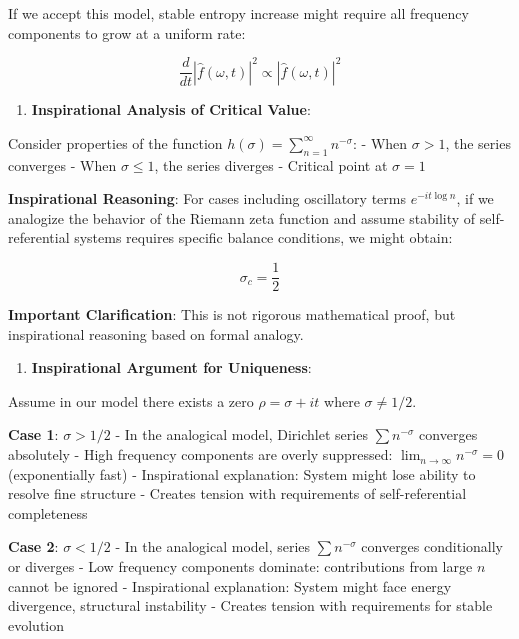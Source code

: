    If we accept this model, stable entropy increase might require all frequency components to grow at a uniform rate:
   
\begin{equation}
\frac{d}{dt}|\hat{f}(\omega,t)|^2 \propto |\hat{f}(\omega,t)|^2
\end{equation}

\begin{enumerate}
\item \textbf{Inspirational Analysis of Critical Value}:
\end{enumerate}
   Consider properties of the function $h(\sigma) = \sum_{n=1}^{\infty} n^{-\sigma}$:
   - When $\sigma > 1$, the series converges
   - When $\sigma \leq 1$, the series diverges
   - Critical point at $\sigma = 1$
   
   \textbf{Inspirational Reasoning}: For cases including oscillatory terms $e^{-it\log n}$, if we analogize the behavior of the Riemann zeta function and assume stability of self-referential systems requires specific balance conditions, we might obtain:
   
\begin{equation}
\sigma_c = \frac{1}{2}
\end{equation}
   
   \textbf{Important Clarification}: This is not rigorous mathematical proof, but inspirational reasoning based on formal analogy.

\begin{enumerate}
\item \textbf{Inspirational Argument for Uniqueness}:
\end{enumerate}
   Assume in our model there exists a zero $\rho = \sigma + it$ where $\sigma \neq 1/2$.
   
   \textbf{Case 1}: $\sigma > 1/2$
   - In the analogical model, Dirichlet series $\sum n^{-\sigma}$ converges absolutely
   - High frequency components are overly suppressed: $\lim_{n\to\infty} n^{-\sigma} = 0$ (exponentially fast)
   - Inspirational explanation: System might lose ability to resolve fine structure
   - Creates tension with requirements of self-referential completeness
   
   \textbf{Case 2}: $\sigma < 1/2$
   - In the analogical model, series $\sum n^{-\sigma}$ converges conditionally or diverges
   - Low frequency components dominate: contributions from large $n$ cannot be ignored
   - Inspirational explanation: System might face energy divergence, structural instability
   - Creates tension with requirements for stable evolution
   
